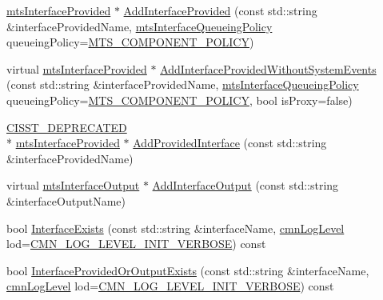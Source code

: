 \begin{DoxyCompactItemize}
\hyperlink{classmts_interface_provided}{mts\-Interface\-Provided} $\ast$ \hyperlink{classmts_component_a99011569c5c9bb52a6abc0e068a89cc5}{Add\-Interface\-Provided} (const std\-::string \&interface\-Provided\-Name, \hyperlink{mts_forward_declarations_8h_abedfb5c45b329a89b0fb647a96a7c938}{mts\-Interface\-Queueing\-Policy} queueing\-Policy=\hyperlink{mts_forward_declarations_8h_abedfb5c45b329a89b0fb647a96a7c938aff70a768b1fb65f10206583efbad12bb}{M\-T\-S\-\_\-\-C\-O\-M\-P\-O\-N\-E\-N\-T\-\_\-\-P\-O\-L\-I\-C\-Y})
\item 
virtual \hyperlink{classmts_interface_provided}{mts\-Interface\-Provided} $\ast$ \hyperlink{classmts_component_a06de220ed3ff629565ec27fded349d81}{Add\-Interface\-Provided\-Without\-System\-Events} (const std\-::string \&interface\-Provided\-Name, \hyperlink{mts_forward_declarations_8h_abedfb5c45b329a89b0fb647a96a7c938}{mts\-Interface\-Queueing\-Policy} queueing\-Policy=\hyperlink{mts_forward_declarations_8h_abedfb5c45b329a89b0fb647a96a7c938aff70a768b1fb65f10206583efbad12bb}{M\-T\-S\-\_\-\-C\-O\-M\-P\-O\-N\-E\-N\-T\-\_\-\-P\-O\-L\-I\-C\-Y}, bool is\-Proxy=false)
\item 
\hyperlink{cmn_portability_8h_a63da7164735f9501be651b1f2bbc0121}{C\-I\-S\-S\-T\-\_\-\-D\-E\-P\-R\-E\-C\-A\-T\-E\-D} \\*
\hyperlink{classmts_interface_provided}{mts\-Interface\-Provided} $\ast$ \hyperlink{classmts_component_af2be5e127e81a607564ea3f05b20c6e1}{Add\-Provided\-Interface} (const std\-::string \&interface\-Provided\-Name)
\item 
virtual \hyperlink{classmts_interface_output}{mts\-Interface\-Output} $\ast$ \hyperlink{classmts_component_a88a3def4ceb33630f635ca67df5b6161}{Add\-Interface\-Output} (const std\-::string \&interface\-Output\-Name)
\item 
bool \hyperlink{classmts_component_ad3c9033d9f370336da54739d6feaa959}{Interface\-Exists} (const std\-::string \&interface\-Name, \hyperlink{cmn_log_lo_d_8h_a70c67165c37a0971e0dd1a85d4edaaae}{cmn\-Log\-Level} lod=\hyperlink{cmn_log_lo_d_8h_ae0fcf22a2f3faaba0c5bf49a237e3f3e}{C\-M\-N\-\_\-\-L\-O\-G\-\_\-\-L\-E\-V\-E\-L\-\_\-\-I\-N\-I\-T\-\_\-\-V\-E\-R\-B\-O\-S\-E}) const 
\item 
bool \hyperlink{classmts_component_a76cc436dda8a33914299ec5db7e3cace}{Interface\-Provided\-Or\-Output\-Exists} (const std\-::string \&interface\-Name, \hyperlink{cmn_log_lo_d_8h_a70c67165c37a0971e0dd1a85d4edaaae}{cmn\-Log\-Level} lod=\hyperlink{cmn_log_lo_d_8h_ae0fcf22a2f3faaba0c5bf49a237e3f3e}{C\-M\-N\-\_\-\-L\-O\-G\-\_\-\-L\-E\-V\-E\-L\-\_\-\-I\-N\-I\-T\-\_\-\-V\-E\-R\-B\-O\-S\-E}) const 

\end{DoxyCompactItemize}
